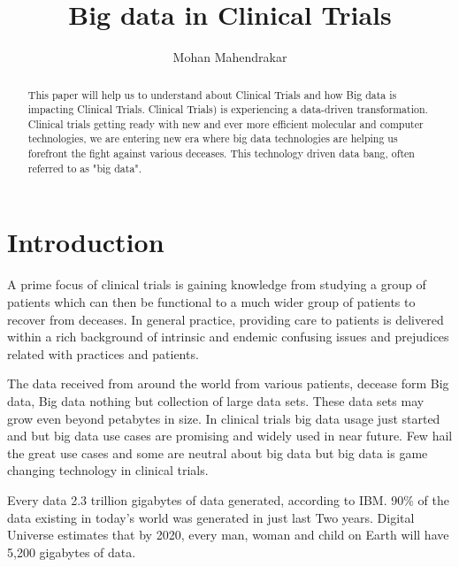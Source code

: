 \documentclass[sigconf]{acmart}
\begin{document}
\title{Big data in Clinical Trials}
\author{Mohan Mahendrakar}

\renewcommand{\shortauthors}{B. Trovato et al.}


\begin{abstract}
This paper will help us to understand about Clinical Trials and how Big
data is impacting Clinical Trials. Clinical Trials) is experiencing a
data-driven transformation. Clinical trials getting ready with new and 
ever more efficient molecular and computer technologies, we are entering
new era where big data technologies are helping us forefront the fight 
against various deceases. This technology driven data bang, often 
referred to as "big data". \cite{TR01}
\end{abstract}


\maketitle

\section{Introduction}
A prime focus of clinical trials is gaining knowledge from studying
a group of patients which can then be functional to a much wider group of
patients to recover from deceases. In general practice, providing care 
to patients is delivered within a rich background of intrinsic and
endemic confusing issues and prejudices related with practices and 
patients.  \cite{TR02}

The data received from around the world from various patients, 
decease form Big data, Big data nothing but collection of large 
data sets. These data sets may grow even beyond petabytes in size.  
In clinical trials big data usage just started and but big data use
cases are promising and widely used in near future. Few hail the great
use cases and some are neutral about big data but big data is game 
changing technology in clinical trials.  \cite{TR05} 

Every data 2.3 trillion gigabytes of data generated, according to IBM. 
90\% of the data existing in today’s world was generated in just last 
Two years. Digital Universe estimates that by 2020, every man, woman
and child on Earth will have 5,200 gigabytes of data.
\end{document}

